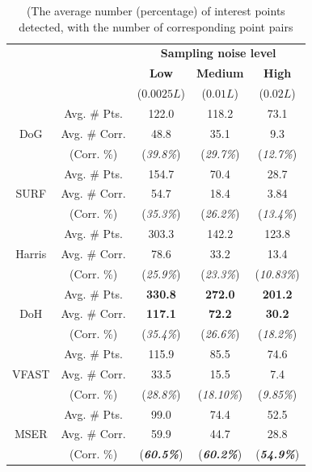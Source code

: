 \begin{table}[ht]
	\centering
	\begin{tabular}{|cc|ccc|}
\hline
& & \multicolumn{3}{c}{\textbf{Sampling noise level}}  \\
& &  {\textbf{Low}}  & {\textbf{Medium}}  & {\textbf{High}}  \\
& & ($0.0025L$) & ($0.01L$) & ($0.02L$) \\
\hline
\hline
\multirow{3}{*}{DoG}  & Avg. \# Pts. &   122.0 & 118.2 & 73.1 \\
& Avg. \# Corr. &  48.8 & 35.1 &  9.3 \\
& (Corr. \%) & (\textit{39.8\%}) & (\textit{29.7\%}) & (\textit{12.7\%}) \\
\hline
\multirow{3}{*}{SURF} & Avg. \# Pts. & 154.7 & 70.4  & 28.7 \\
& Avg. \# Corr. &  54.7 & 18.4  & 3.84 \\
& (Corr. \%) &  (\textit{35.3\%}) & (\textit{26.2\%})  & (\textit{13.4\%}) \\
\hline
\multirow{3}{*}{Harris} & Avg. \# Pts. & 303.3 & 142.2 &  123.8 \\
& Avg. \# Corr. & 78.6  & 33.2  &    13.4  \\
& (Corr. \%) & (\textit{25.9\%}) & (\textit{23.3\%}) & (\textit{10.83\%}) \\
\hline
\multirow{3}{*}{DoH}& Avg. \# Pts. &  {\textbf{\color{blue}330.8}} & {\textbf{\color{blue}272.0}} &   {\textbf{\color{blue}201.2}} \\
& Avg. \# Corr. & {\textbf{\color{blue}117.1}} & {\textbf{\color{blue}72.2}}  &   {\textbf{\color{blue}30.2}} \\
& (Corr. \%) & (\textit{35.4\%}) & (\textit{26.6\%}) & (\textit{18.2\%}) \\
\hline
\multirow{3}{*}{VFAST}& Avg. \# Pts. &  115.9 &  85.5  &  74.6\\ 
& Avg. \# Corr. & 33.5  & 15.5  &    7.4 \\
& (Corr. \%) & (\textit{28.8\%}) & (\textit{18.10\%})  & (\textit{9.85\%}) \\
\hline
\multirow{3}{*}{MSER}& Avg. \# Pts.  &  99.0  & 74.4  &   52.5 \\
& Avg. \# Corr. & 59.9 & 44.7  &   28.8 \\
& (Corr. \%) & ({\textit{\textbf{\color{blue}60.5\%}}})  & ({\textit{\textbf{\color{blue}60.2\%}}})  & ({\textit{\textbf{\color{blue}54.9\%}}})\\
\hline
\end{tabular}
\caption{(The average number (percentage) of interest points detected, with the number of corresponding point pairs}
\label{tab/eval/numcorr}
\end{table}


